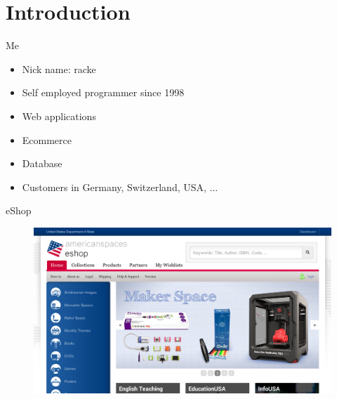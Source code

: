 
\maketitle

\begin{frame}
  \titlepage
\end{frame}

\cleardoublepage

\tableofcontents

\cleardoublepage

\section{Introduction}



\begin{frame}{Me}
\begin{itemize}
\item Nick name: racke
\item Self employed programmer since 1998
\item Web applications
\item Ecommerce
\item Database
\item Customers in Germany, Switzerland, USA, ...
\end{itemize}
\end{frame}


\begin{frame}{eShop}
\begin{figure}[!ht]
\centering
\includegraphics[width=1\linewidth]{img/eshop.png}
\end{figure}
\end{frame}

